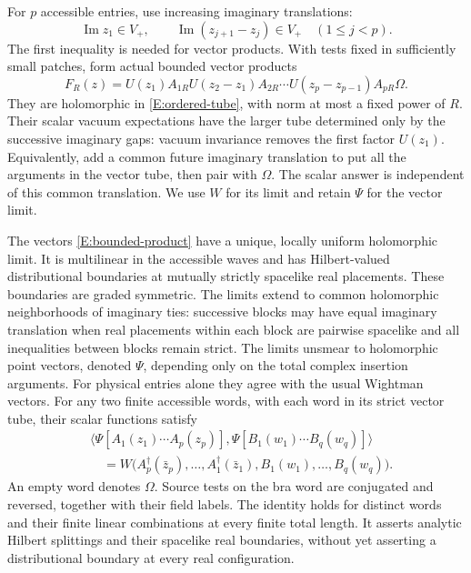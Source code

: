 For $p$ accessible entries, use increasing imaginary translations:
\begin{equation}\label{E:ordered-tube}
 \operatorname{Im}z_1\in V_+,
 \qquad\operatorname{Im}(z_{j+1}-z_j)\in V_+
 \quad(1\leq j<p).
\end{equation}
The first inequality is needed for vector products.  With tests fixed
in sufficiently small patches, form actual bounded vector products
\begin{equation}\label{E:bounded-product}
 F_R(z)=U(z_1)A_{1R}U(z_2-z_1)A_{2R}\cdots
           U(z_p-z_{p-1})A_{pR}\Omega.
\end{equation}
They are holomorphic in \eqref{E:ordered-tube}, with norm at most a
fixed power of $R$.
Their scalar vacuum expectations have the larger tube determined only
by the successive imaginary gaps: vacuum invariance removes the first
factor $U(z_1)$.  Equivalently, add a common future imaginary translation
to put all the arguments in the vector tube, then pair with $\Omega$.
The scalar answer is independent of this common translation.  We use
$W$ for its limit and retain $\Psi$ for the vector limit.

\begin{proposition}\label{E:accessible-products}
The vectors \eqref{E:bounded-product} have a unique, locally uniform
holomorphic limit.  It is multilinear in the accessible waves and has
Hilbert-valued distributional boundaries at mutually strictly
spacelike real placements.  These boundaries are graded symmetric.
The limits extend to common holomorphic neighborhoods of imaginary
ties: successive blocks may have equal imaginary translation when
real placements within each block are pairwise spacelike and all
inequalities between blocks remain strict.  The limits unsmear to
holomorphic point vectors, denoted $\Psi$, depending only on the total
complex insertion arguments.  For physical entries alone they agree
with the usual Wightman vectors.
For any two finite accessible words, with each word in its strict
vector tube, their scalar functions satisfy
\begin{equation}\label{E:accessible-splitting}
 \begin{split}
 &\big\langle\Psi[A_1(z_1)\cdots A_p(z_p)],
                  \Psi[B_1(w_1)\cdots B_q(w_q)]\big\rangle\\
 &\quad=W\bigl(A_p^\dagger(\bar z_p),\ldots,
               A_1^\dagger(\bar z_1),B_1(w_1),\ldots,B_q(w_q)\bigr).
 \end{split}
\end{equation}
An empty word denotes $\Omega$.  Source tests on the bra word are
conjugated and reversed, together with their field labels.  The identity
holds for distinct words and their finite linear combinations at every
finite total length.  It asserts analytic Hilbert splittings and their
spacelike real boundaries, without yet asserting a distributional
boundary at every real configuration.
\end{proposition}

